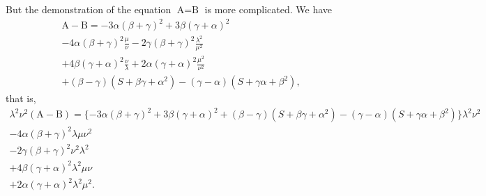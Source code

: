 \documentclass[11pt,a4paper]{book}
\begin{document}
But the demonstration of the equation $\text{A} = \text{B}$ is more complicated. We have
%
\begin{multline}
\text{A} - \text{B} = -3\alpha(\beta + \gamma)^{2} + 3\beta(\gamma + \alpha)^{2} \\
- 4\alpha(\beta + \gamma)^{2}\tfrac{\mu}{\nu} - 2\gamma(\beta + \gamma)^{2}\tfrac{\lambda^{2}}{\mu^{2}} \\
+ 4\beta(\gamma + \alpha)^{2}\tfrac{\nu}{\lambda} + 2\alpha(\gamma + \alpha)^{2}\tfrac{\mu^{2}}{\nu^{2}} \\
+ (\beta - \gamma)(S + \beta\gamma + \alpha^{2}) - (\gamma - \alpha)(S + \gamma\alpha + \beta^{2}),
\end{multline}
%
that is,
%
\begin{multline}
\lambda^{2}\nu^{2}(\text{A} - \text{B}) = \{-3\alpha(\beta + \gamma)^{2} + 3\beta(\gamma + \alpha)^{2} + (\beta - \gamma)(S + \beta\gamma + \alpha^{2}) - (\gamma - \alpha)(S + \gamma\alpha + \beta^{2})\}\lambda^{2}\nu^{2} \\
- 4\alpha(\beta + \gamma)^{2}\lambda\mu\nu^{2} \\
- 2\gamma(\beta + \gamma)^{2}\nu^{2}\lambda^{2} \\
+ 4\beta(\gamma + \alpha)^{2}\lambda^{2}\mu\nu \\
+ 2\alpha(\gamma + \alpha)^{2}\lambda^{2}\mu^{2}.
\end{multline}

\newpage
\setcounter{page}{111}
\end{document}
